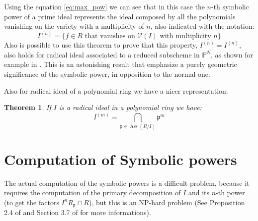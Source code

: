 \documentclass[notitlepage, a4]{book}
\theoremstyle{plain}
\newtheorem{teo}{Theorem}[section]
\theoremstyle{remark}
\theoremstyle{definition}
\newcommand{\PP}{\mathbb{P}}
\newcommand{\p}{\mathfrak{p}}
\DeclareMathOperator{\Ass}{Ass}
\begin{document}
Using the equation \ref{eq:max_pow} we can see that in this case the $ n $-th symbolic power of a prime ideal represents the ideal composed by all the polynomials vanishing on the variety with a multiplicity of $ n $, also indicated with the notation:
\begin{equation}\label{eq:ideal_vanish}
	I^{\left<n\right>} = \{ f \in R \text{ that vanishes on } \mathcal{V}(I) \text{ with multiplicity } n\}
\end{equation}
Also is possible to use this theorem to prove that this property, $ I^{(n)} = I^{\left<n\right>} $, also holds for radical ideal associated to a reduced subscheme in $ \PP ^N $, as shown for example in \cite[Corollary 2.9]{Sid09}.
This is an astonishing result that emphasize a purely geometric significance of the symbolic power, in opposition to the normal one. 

Also for radical ideal of a polynomial ring we have a nicer representation:
\begin{teo}\label{teo:sym_radical}
If $ I $ is a radical ideal in a polynomial ring we have:
\begin{equation}
		I^{(m)} = \bigcap_{\p \in \Ass(R/I) } \p^m
	\end{equation}
\end{teo}



\section{Computation of Symbolic powers}

%

The actual computation of the symbolic powers is a difficult problem, because it requires the computation of the primary decomposition of $ I $ and its $ n $-th power (to get the factors $ I^n R_\p \cap R $), but this is an NP-hard problem (See Proposition 2.4 of \cite{Serk02} and Section 3.7 of \cite{Swa17} for more informations). 
\end{document}
